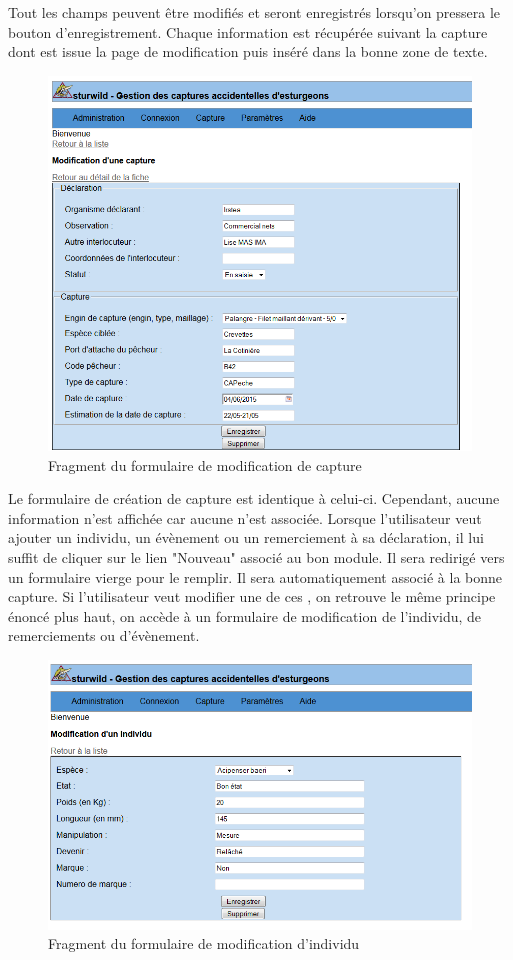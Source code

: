\documentclass[12pt,a4paper,titlepage,twoside]{report}
\begin{document}
Tout les champs peuvent être modifiés et seront enregistrés lorsqu'on pressera le bouton d'enregistrement. Chaque information est récupérée suivant la capture dont est issue la page de modification puis inséré dans la bonne zone de texte.
\begin{figure}[h]
\centering
\includegraphics[width=\textwidth]{pictures/modifCapture.png}
\caption{Fragment du formulaire de modification de capture}
\end{figure}\newline
Le formulaire de création de capture est identique à celui-ci. Cependant, aucune information n'est affichée car aucune n'est associée. 
\clearpage
Lorsque l'utilisateur veut ajouter un individu, un évènement ou un remerciement à sa déclaration, il lui suffit de cliquer sur le lien "Nouveau" associé au bon module. Il sera redirigé vers un formulaire vierge pour le remplir. Il sera automatiquement associé à la bonne capture.
Si l'utilisateur veut modifier une de ces , on retrouve le même principe énoncé plus haut, on accède à un formulaire de modification de l'individu, de remerciements ou d'évènement. 

\begin{figure}[h]
\centering
\includegraphics[width=\textwidth]{pictures/modifIndividu.png}
\caption{Fragment du formulaire de modification d'individu}
\end{figure}
\end{document}

